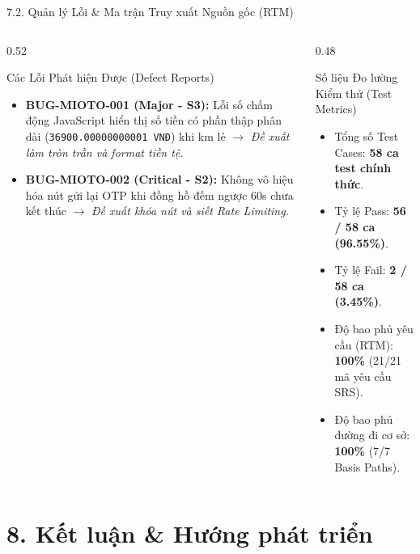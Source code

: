 \documentclass[aspectratio=169,10pt]{beamer}
\begin{document}
\begin{frame}{7.2. Quản lý Lỗi \& Ma trận Truy xuất Nguồn gốc (RTM)}
  \begin{columns}
    \begin{column}{0.52\textwidth}
      \begin{alertblock}{Các Lỗi Phát hiện Được (Defect Reports)}
        \begin{itemize}
          \item \textbf{BUG-MIOTO-001 (Major - S3):} Lỗi số chấm động JavaScript hiển thị số tiền có phần thập phân dài (\texttt{36900.00000000001 VNĐ}) khi km lẻ $\to$ \textit{Đề xuất làm tròn trần và format tiền tệ.}
          \item \textbf{BUG-MIOTO-002 (Critical - S2):} Không vô hiệu hóa nút gửi lại OTP khi đồng hồ đếm ngược 60s chưa kết thúc $\to$ \textit{Đề xuất khóa nút và siết Rate Limiting.}
        \end{itemize}
      \end{alertblock}
    \end{column}
    \begin{column}{0.48\textwidth}
      \begin{exampleblock}{Số liệu Đo lường Kiểm thử (Test Metrics)}
        \begin{itemize}
          \item Tổng số Test Cases: \textbf{58 ca test chính thức}.
          \item Tỷ lệ Pass: \textbf{56 / 58 ca (96.55\%)}.
          \item Tỷ lệ Fail: \textbf{2 / 58 ca (3.45\%)}.
          \item Độ bao phủ yêu cầu (RTM): \textbf{100\%} (21/21 mã yêu cầu SRS).
          \item Độ bao phủ đường đi cơ sở: \textbf{100\%} (7/7 Basis Paths).
        \end{itemize}
      \end{exampleblock}
    \end{column}
  \end{columns}
\end{frame}

\section{8. Kết luận \& Hướng phát triển}
\end{document}
